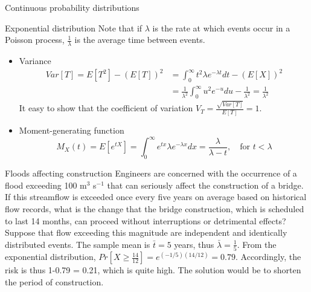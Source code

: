 \documentclass[8pt]{beamer}
\renewcommand{\emph}[1]{\textcolor{myorange}{#1}}
\begin{document}
\begin{frame}{Continuous probability distributions}
    \begin{block}{\alert{Exponential} distribution}
                Note that if $\lambda$ is the rate at which events occur in a \emph{Poisson process}, $\frac{1}{\lambda}$ is the average time between events. 
       \begin{itemize}
            \item \emph{Variance}
                \vspace{-5pt}
         \begin{align*}
             \displaystyle
             Var[T] = E[T^2] - \left( E[T] \right)^2 &= \int_0^\infty t^2 \lambda e^{-\lambda t} dt - \left( E[X] \right)^2  \\
                                                     &= \frac{1}{\lambda^2} \int_0^\infty u^2 e^{-u} du - \frac{1}{\lambda^2} = \frac{1}{\lambda^2}
         \end{align*}
                \vspace{-5pt}
         It easy to show that  the \emph{coefficient of variation} $V_T = \frac{\sqrt{Var[T]}}{E[T]} = 1$.

    \item \emph{Moment-generating function}
                \vspace{-5pt}
\[
    M_X (t) = E \left[e^{tX} \right] = \int_0^\infty e^{tx} \lambda e^{-\lambda x} dx = \frac{\lambda}{\lambda - t}, \quad \text{for } t < \lambda 
\]
       \end{itemize}
    \end{block}
                \vspace{-10pt}
     \begin{exampleblock}{Floods affecting construction}
         Engineers are concerned with the occurrence of a flood exceeding 100 m$^3$ s$^{-1}$ that can seriously affect the construction of a bridge. If this streamflow is exceeded once every five years on average based on historical flow records, what is the change that the bridge construction, which is scheduled to last 14 months, can proceed without interruptions or detrimental effects? 
         Suppose that flow exceeding this magnitude are independent and identically distributed events. The sample mean is $\bar{t} = 5$ years, thus $\bar{\lambda} = \frac{1}{5}$. From the exponential distribution, $Pr \left[ X \geq \frac{14}{12} \right] = e^{(-1/5) (14/12)} = 0.79$. Accordingly, the risk is thus 1-0.79 = 0.21, which is quite high. The solution would be to shorten the period of construction. 
    \end{exampleblock}
\end{frame}
\end{document}
